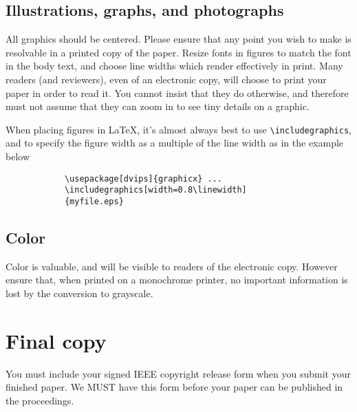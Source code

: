 \documentclass[10pt,twocolumn,letterpaper]{article}
\begin{document}
	\subsection{Illustrations, graphs, and photographs}
	
	All graphics should be centered.  Please ensure that any point you wish to
	make is resolvable in a printed copy of the paper.  Resize fonts in figures
	to match the font in the body text, and choose line widths which render
	effectively in print.  Many readers (and reviewers), even of an electronic
	copy, will choose to print your paper in order to read it.  You cannot
	insist that they do otherwise, and therefore must not assume that they can
	zoom in to see tiny details on a graphic.
	
	When placing figures in \LaTeX, it's almost always best to use
	\verb+\includegraphics+, and to specify the  figure width as a multiple of
	the line width as in the example below
	{\small\begin{verbatim}
			\usepackage[dvips]{graphicx} ...
			\includegraphics[width=0.8\linewidth]
			{myfile.eps}
		\end{verbatim}
	}
	
	
	\subsection{Color}
	
	Color is valuable, and will be visible to readers of the electronic copy.
	However ensure that, when printed on a monochrome printer, no important
	information is lost by the conversion to grayscale.
	
	\section{Final copy}
	
	You must include your signed IEEE copyright release form when you submit
	your finished paper. We MUST have this form before your paper can be
	published in the proceedings.
	
	
	{\small
		
		
	}
	
\end{document}
